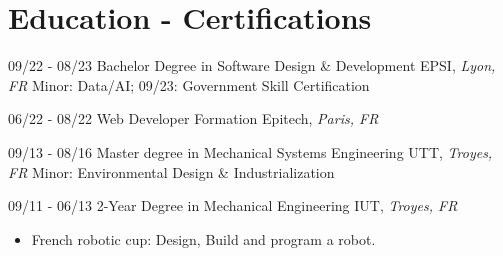 \documentclass[]{friggeri-cv}
\begin{document}
\section{Education - Certifications}
\vspace*{-0.25cm}
\vspace{0.5mm}
    \begin{entrylist}
    \entry
        {09/22 - 08/23}
        {Bachelor Degree in Software Design \& Development}
        {EPSI, \textit{Lyon, FR}}
        {Minor: Data/AI; \hspace{7mm} 09/23: Government Skill Certification}
    \end{entrylist}
    \vspace{0.5mm}
\begin{entrylist}
\entry
    {06/22 - 08/22}
    {Web Developer Formation}
    {Epitech, \textit{Paris, FR}}
    {}
\end{entrylist}
\vspace{0.5mm}
    \begin{entrylist}
    \entry
        {09/13 - 08/16}
        {Master degree in Mechanical Systems Engineering}
        {UTT, \textit{Troyes, FR}}
        {Minor: Environmental Design \& Industrialization}
    \end{entrylist}
    \vspace{0.5mm}
\begin{entrylist}
\entry
    {09/11 - 06/13}
    {2-Year Degree in Mechanical Engineering}
    {IUT, \textit{Troyes, FR}}
    {}
\end{entrylist}
\vspace*{-0.7cm}
\begin{itemize}
\setlength{\itemsep}{1pt}
\setlength{\parskip}{0pt}
\setlength{\parsep}{0pt}
\item French robotic cup: Design, Build and program a robot.
\end{itemize}
\end{document}
